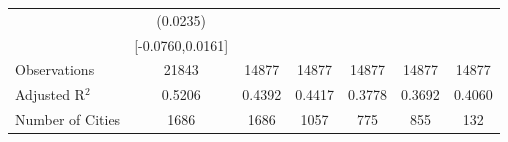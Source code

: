 \documentclass{article}
\begin{document}
\begin{table}[htbp]
\begin{tabular}{l*{6}{c}}
                    &    (0.0235)   &               &               &               &               &               \\
                    &[-0.0760,0.0161]   &               &               &               &               &               \\
\midrule
Observations        &       21843   &       14877   &       14877   &       14877   &       14877   &       14877   \\
Adjusted R$^2$      &      0.5206   &      0.4392   &      0.4417   &      0.3778   &      0.3692   &      0.4060   \\
Number of Cities    &        1686   &        1686   &        1057   &         775   &         855   &         132   \\
\bottomrule
\end{tabular}
\end{table}
\end{document}
